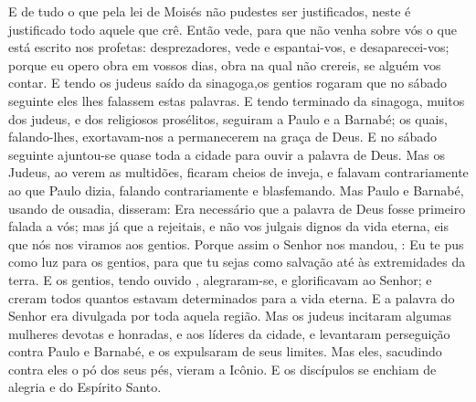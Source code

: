 {  E de tudo o que pela lei de Moisés não pudestes ser justificados, neste é justificado todo aquele que crê.
  Então vede, para que não venha sobre vós o que está escrito nos
{} profetas:
   desprezadores, vede e espantai-vos, e desaparecei-vos; porque eu opero obra em vossos dias, obra na qual não crereis, se alguém vos contar.
  E tendo os judeus saído da sinagoga,os gentios rogaram
{} que no sábado seguinte eles lhes falassem estas palavras.
  E tendo terminado
{} da sinagoga, muitos dos judeus, e dos religiosos prosélitos, seguiram a Paulo e a Barnabé; os quais, falando-lhes, exortavam-nos a permanecerem na graça de Deus.
  E no sábado seguinte ajuntou-se quase toda a cidade para ouvir a palavra de Deus.
  Mas os Judeus, ao verem as multidões, ficaram cheios de inveja, e falavam contrariamente ao que Paulo dizia, falando contrariamente e blasfemando.
  Mas Paulo e Barnabé, usando de ousadia, disseram: Era necessário que a palavra de Deus fosse primeiro falada a vós; mas já que a rejeitais, e não vos julgais dignos da vida eterna, eis que nós nos viramos
{} aos gentios.
  Porque assim o Senhor nos mandou,
{} : Eu te pus como luz para os gentios, para que tu sejas como salvação até às extremidades da terra.
  E os gentios, tendo ouvido
{}, alegraram-se, e glorificavam ao Senhor; e creram todos quantos estavam determinados para a vida eterna.
  E a palavra do Senhor era divulgada por toda aquela região.
  Mas os judeus incitaram algumas mulheres devotas e honradas, e aos líderes da cidade, e levantaram perseguição contra Paulo e Barnabé, e os expulsaram de seus limites.
  Mas eles, sacudindo contra eles o pó dos seus pés, vieram a Icônio.
  E os discípulos se enchiam de alegria e do Espírito Santo.
\par }


